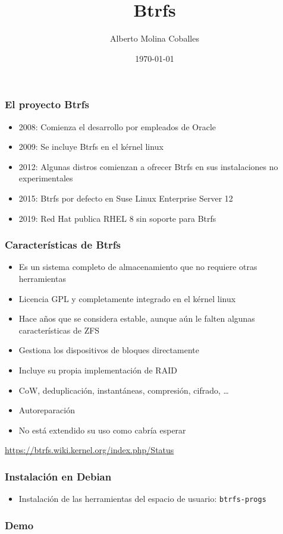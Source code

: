 \documentclass[aspectratio=169]{beamer}
\author{Alberto Molina Coballes}
\title{Btrfs}
\institute{IES Gonzalo Nazareno}
\date{\today}
\begin{document}
\def\braces#1{[#1]}

\begin{frame}[t,plain]
\titlepage
\end{frame}

\begin{frame}
  \frametitle{El proyecto Btrfs}
  \begin{itemize}
  \item 2008: Comienza el desarrollo por empleados de Oracle
  \item 2009: Se incluye Btrfs en el kérnel linux
  \item 2012: Algunas distros comienzan a ofrecer Btrfs en sus instalaciones no experimentales
  \item 2015: Btrfs por defecto en Suse Linux Enterprise Server 12
  \item 2019: Red Hat publica RHEL 8 sin soporte para Btrfs
  \end{itemize}
\end{frame}

\begin{frame}
  \frametitle{Características de Btrfs}
  \begin{itemize}
  \item Es un sistema completo de almacenamiento que no requiere
    otras herramientas
  \item Licencia GPL y completamente integrado en el kérnel linux
  \item Hace años que se considera estable, aunque aún le falten
    algunas características de ZFS
  \item Gestiona los dispositivos de bloques directamente
  \item Incluye su propia implementación de RAID
  \item CoW, deduplicación, instantáneas, compresión, cifrado, \ldots
  \item Autoreparación
  \item No está extendido su uso como cabría esperar
  \end{itemize}
  \small{\url{https://btrfs.wiki.kernel.org/index.php/Status}}
\end{frame}

\begin{frame}
  \frametitle{Instalación en Debian}
  \begin{itemize}
  \item Instalación de las herramientas del espacio de usuario: \texttt{btrfs-progs}
  \end{itemize}
\end{frame}

\begin{frame}
  \frametitle{Demo}
\end{frame}
\end{document}

